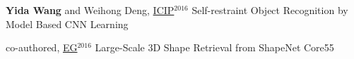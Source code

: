 \begin{cventries}
\begin{enumerate}[label={[\arabic*]}, leftmargin=*]
\item 
\cvpublication
{\textbf{Yida Wang} and Weihong Deng, \underline{ICIP}$^{2016}$} %
{Self-restraint Object Recognition by Model Based CNN Learning} %
{} %
{} %


\item 
\cvpublication
{co-authored, \underline{EG}$^{2016}$} %
{Large-Scale 3D Shape Retrieval from ShapeNet Core55} %
{} %
{} %


\end{enumerate}


\end{cventries}
